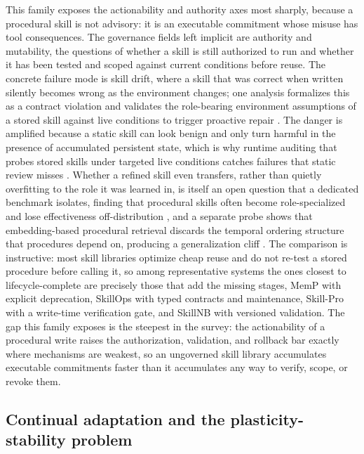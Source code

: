 This family exposes the actionability and authority axes most sharply, because a procedural skill is not advisory: it is an executable commitment whose misuse has tool consequences. The governance fields left implicit are authority and mutability, the questions of whether a skill is still authorized to run and whether it has been tested and scoped against current conditions before reuse. The concrete failure mode is skill drift, where a skill that was correct when written silently becomes wrong as the environment changes; one analysis formalizes this as a contract violation and validates the role-bearing environment assumptions of a stored skill against live conditions to trigger proactive repair \citep{fan2026skilldriftcontract}. The danger is amplified because a static skill can look benign and only turn harmful in the presence of accumulated persistent state, which is why runtime auditing that probes stored skills under targeted live conditions catches failures that static review misses \citep{lan2026runtimeskillaudit}. Whether a refined skill even transfers, rather than quietly overfitting to the role it was learned in, is itself an open question that a dedicated benchmark isolates, finding that procedural skills often become role-specialized and lose effectiveness off-distribution \citep{belikova2026managingproceduralmemory}, and a separate probe shows that embedding-based procedural retrieval discards the temporal ordering structure that procedures depend on, producing a generalization cliff \citep{kohar2025proceduralmemoryretrieval}. The comparison is instructive: most skill libraries optimize cheap reuse and do not re-test a stored procedure before calling it, so among representative systems the ones closest to lifecycle-complete are precisely those that add the missing stages, MemP with explicit deprecation, SkillOps with typed contracts and maintenance, Skill-Pro with a write-time verification gate, and SkillNB with versioned validation. The gap this family exposes is the steepest in the survey: the actionability of a procedural write raises the authorization, validation, and rollback bar exactly where mechanisms are weakest, so an ungoverned skill library accumulates executable commitments faster than it accumulates any way to verify, scope, or revoke them.

\subsection{Continual adaptation and the plasticity-stability problem}


